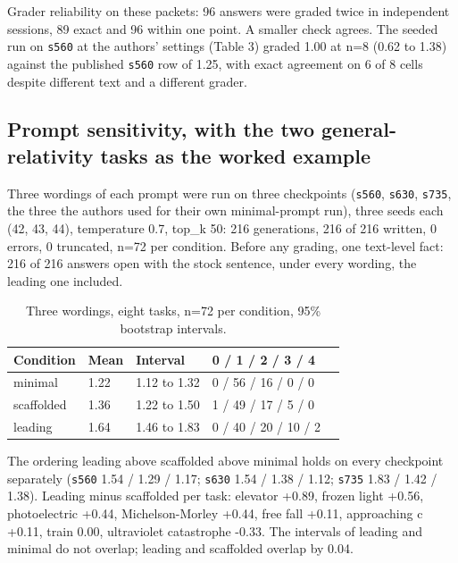 \documentclass[reprint,prx,amsmath,amssymb,aps,superscriptaddress]{revtex4-2}
\begin{document}
Grader reliability on these packets: 96 answers were graded twice in independent sessions, 89 exact and 96 within one point. A smaller check agrees. The seeded run on \texttt{s560} at the authors' settings (Table 3) graded 1.00 at n=8 (0.62 to 1.38) against the published \texttt{s560} row of 1.25, with exact agreement on 6 of 8 cells despite different text and a different grader.

\subsection{Prompt sensitivity, with the two general-relativity tasks as the worked example}

Three wordings of each prompt were run on three checkpoints (\texttt{s560}, \texttt{s630}, \texttt{s735}, the three the authors used for their own minimal-prompt run), three seeds each (42, 43, 44), temperature 0.7, top\_k 50: 216 generations, 216 of 216 written, 0 errors, 0 truncated, n=72 per condition. Before any grading, one text-level fact: 216 of 216 answers open with the stock sentence, under every wording, the leading one included.

\begin{table}[t]
\caption{Three wordings, eight tasks, n=72 per condition, 95\% bootstrap intervals.}
\begin{ruledtabular}
\begin{tabular}{lllll}
Condition & Mean & Interval & 0 / 1 / 2 / 3 / 4 &  \\
\hline
minimal & 1.22 & 1.12 to 1.32 & 0 / 56 / 16 / 0 / 0 &  \\
scaffolded & 1.36 & 1.22 to 1.50 & 1 / 49 / 17 / 5 / 0 &  \\
leading & 1.64 & 1.46 to 1.83 & 0 / 40 / 20 / 10 / 2 &  \\
\end{tabular}
\end{ruledtabular}
\end{table}

The ordering leading above scaffolded above minimal holds on every checkpoint separately (\texttt{s560} 1.54 / 1.29 / 1.17; \texttt{s630} 1.54 / 1.38 / 1.12; \texttt{s735} 1.83 / 1.42 / 1.38). Leading minus scaffolded per task: elevator +0.89, frozen light +0.56, photoelectric +0.44, Michelson-Morley +0.44, free fall +0.11, approaching c +0.11, train 0.00, ultraviolet catastrophe -0.33. The intervals of leading and minimal do not overlap; leading and scaffolded overlap by 0.04.
\end{document}
